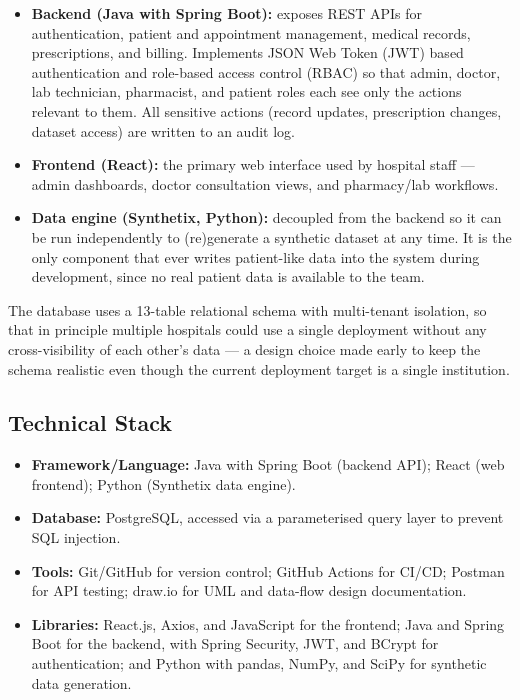\documentclass[12pt,a4paper]{report}
\begin{document}
\begin{itemize}[leftmargin=*]
    \item \textbf{Backend (Java with Spring Boot):} exposes REST APIs for authentication, patient and appointment management, medical records, prescriptions, and billing. Implements JSON Web Token (JWT) based authentication and role-based access control (RBAC) so that admin, doctor, lab technician, pharmacist, and patient roles each see only the actions relevant to them. All sensitive actions (record updates, prescription changes, dataset access) are written to an audit log.
    \item \textbf{Frontend (React):} the primary web interface used by hospital staff --- admin dashboards, doctor consultation views, and pharmacy/lab workflows.
    \item \textbf{Data engine (Synthetix, Python):} decoupled from the backend so it can be run independently to (re)generate a synthetic dataset at any time. It is the only component that ever writes patient-like data into the system during development, since no real patient data is available to the team.
\end{itemize}

The database uses a 13-table relational schema with multi-tenant isolation, so that in principle multiple hospitals could use a single deployment without any cross-visibility of each other's data --- a design choice made early to keep the schema realistic even though the current deployment target is a single institution.

\subsection{Technical Stack}

\begin{itemize}[leftmargin=*]
    \item \textbf{Framework/Language:} Java with Spring Boot (backend API); React (web frontend); Python (Synthetix data engine).
    \item \textbf{Database:} PostgreSQL, accessed via a parameterised query layer to prevent SQL injection.
    \item \textbf{Tools:} Git/GitHub for version control; GitHub Actions for CI/CD; Postman for API testing; draw.io for UML and data-flow design documentation.
    \item \textbf{Libraries:} React.js, Axios, and JavaScript for the frontend; Java and Spring Boot for the backend, with Spring Security, JWT, and BCrypt for authentication; and Python with pandas, NumPy, and SciPy for synthetic data generation.
\end{itemize}
\end{document}
